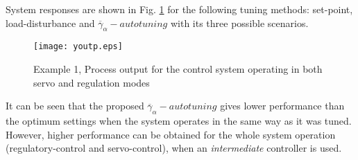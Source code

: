 System responses are shown in Fig. \ref{y_out} for the following
tuning methods: set-point, load-disturbance and
$\overline{\gamma}_{\alpha}-autotuning$ with its three possible
scenarios.\\

\begin{figure}[htb!]
    \begin{center}
        \texttt{[image: youtp.eps]}
        \caption{Example 1, Process output for the control system operating in both servo and regulation modes}
        \label{y_out}
    \end{center}
\end{figure}




It can be seen that the proposed
$\overline{\gamma}_{\alpha}-autotuning$ gives lower performance
than the optimum settings when the system operates in the same way
as it was tuned. However, higher performance can be obtained for
the whole system operation (regulatory-control and
servo-control), when an \emph{intermediate} controller is used.\\

